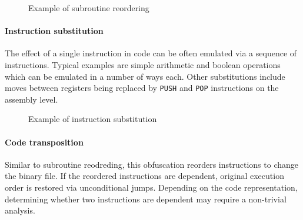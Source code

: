 \begin{figure}[H]
    \centering
    \caption{Example of subroutine reordering}
    \label{fig_obf_perm}
\end{figure}

\paragraph*{Instruction substitution}
The effect of a single instruction in code can be often emulated via a sequence of instructions. Typical examples are simple arithmetic and boolean operations which can be emulated in a number of ways each. Other substitutions include moves between registers being replaced by \texttt{PUSH} and \texttt{POP} instructions on the assembly level.

\begin{figure}[H]
    \centering
    \caption{Example of instruction substitution}
    \label{fig_obf_instrsub}
\end{figure}

\paragraph*{Code transposition}
Similar to subroutine reodreding, this obfuscation reorders instructions to change the binary file. If the reordered instructions are dependent, original execution order is restored via unconditional jumps. Depending on the code representation, determining whether two instructions are dependent may require a non-trivial analysis.


